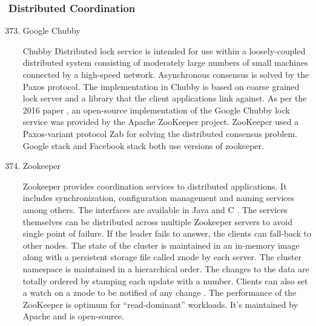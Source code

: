 \subsubsection{Distributed Coordination}
\label{\detokenize{i524/technologies:distributed-coordination}}\begin{enumerate}
\setcounter{enumi}{372}
\item {} 
Google Chubby

Chubby Distributed lock service \label{\detokenize{i524/technologies:id683}}{\hyperref[\detokenize{i524/technologies:www-chubby}]{\sphinxcrossref{{[}594{]}}}}
is intended for use within a loosely-coupled distributed system
consisting of moderately large numbers of small machines
connected by a high-speed network. Asynchronous consensus is
solved by the Paxos protocol. The implementation in Chubby is
based on coarse grained lock server and a library that the client
applications link against.  As per the 2016 paper
\label{\detokenize{i524/technologies:id684}}{\hyperref[\detokenize{i524/technologies:chubby-paper-2016}]{\sphinxcrossref{{[}595{]}}}}, an open-source implementation of the
Google Chubby lock service was provided by the Apache ZooKeeper
project. ZooKeeper used a Paxos-variant protocol Zab for solving
the distributed consensus problem.  Google stack and Facebook
stack both use versions of zookeeper.

\item {} 
Zookeeper

Zookeeper provides coordination services to distributed applications.
It includes synchronization, configuration management and naming
services among others. The interfaces are available in Java and C
\label{\detokenize{i524/technologies:id685}}{\hyperref[\detokenize{i524/technologies:www-zoo-overiew}]{\sphinxcrossref{{[}596{]}}}}. The services themselves can be distributed
across multiple Zookeeper servers to avoid single point of failure.
If the leader fails to answer, the clients can fall-back to other
nodes. The state of the cluster is maintained in an in-memory image
along with a persistent storage file called znode by each server. The
cluster namespace is maintained in a hierarchical order. The changes to the
data are totally ordered \label{\detokenize{i524/technologies:id686}}{\hyperref[\detokenize{i524/technologies:www-zoo-wiki}]{\sphinxcrossref{{[}597{]}}}} by stamping each update
with a number. Clients can also set a watch on a znode to be notified
of any change \label{\detokenize{i524/technologies:id687}}{\hyperref[\detokenize{i524/technologies:www-zoo-ibm}]{\sphinxcrossref{{[}598{]}}}}. The performance of the ZooKeeper
is optimum for ``read-dominant'' workloads. It's maintained by Apache
and is open-source.


\end{enumerate}
